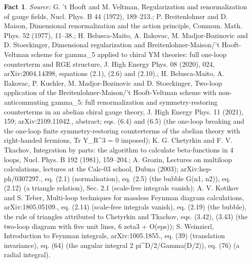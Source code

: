 \documentclass[11pt]{article}
\theoremstyle{definition}
\newtheorem{fact}[theorem]{Fact}
\theoremstyle{plain}
\begin{document}
\begin{fact}
\emph{Source:} G. 't Hooft and M. Veltman, Regularization and renormalization of gauge fields, Nucl. Phys. B 44 (1972), 189--213.; P. Breitenlohner and D. Maison, Dimensional renormalization and the action principle, Commun. Math. Phys. 52 (1977), 11--38.; H. Belusca-Maito, A. Ilakovac, M. Madjor-Bozinovic and D. Stoeckinger, Dimensional regularization and Breitenlohner-Maison/'t Hooft-Veltman scheme for gamma\_5 applied to chiral YM theories: full one-loop counterterm and RGE structure, J. High Energy Phys. 08 (2020), 024, arXiv:2004.14398, equations (2.1), (2.6) and (2.10).; H. Belusca-Maito, A. Ilakovac, P. Kuehler, M. Madjor-Bozinovic and D. Stoeckinger, Two-loop application of the Breitenlohner-Maison/'t Hooft-Veltman scheme with non-anticommuting gamma\_5: full renormalization and symmetry-restoring counterterms in an abelian chiral gauge theory, J. High Energy Phys. 11 (2021), 159; arXiv:2109.11042., abstract; eqs. (6.4) and (6.5) (the one-loop breaking and the one-loop finite symmetry-restoring counterterms of the abelian theory with right-handed fermions, Tr Y\_R\^{}3 = 0 imposed); K. G. Chetyrkin and F. V. Tkachov, Integration by parts: the algorithm to calculate beta-functions in 4 loops, Nucl. Phys. B 192 (1981), 159--204.; A. Grozin, Lectures on multiloop calculations, lectures at the Calc-03 school, Dubna (2003); arXiv:hep-ph/0307297., eq. (2.1) (normalisation), eq. (2.5) (the bubble G(n1, n2)), eq. (2.12) (a triangle relation), Sec. 2.1 (scale-free integrals vanish); A. V. Kotikov and S. Teber, Multi-loop techniques for massless Feynman diagram calculations, arXiv:1805.05109., eq. (2.14) (scale-free integrals vanish), eq. (2.19) (the bubble), the rule of triangles attributed to Chetyrkin and Tkachov, eqs. (3.42), (3.43) (the two-loop diagram with five unit lines, 6 zeta3 + O(eps)); S. Weinzierl, Introduction to Feynman integrals, arXiv:1005.1855., eq. (39) (translation invariance), eq. (64) (the angular integral 2 pi\^{}{D/2}/Gamma(D/2)), eq. (76) (a radial integral).
\end{fact}
\end{document}
